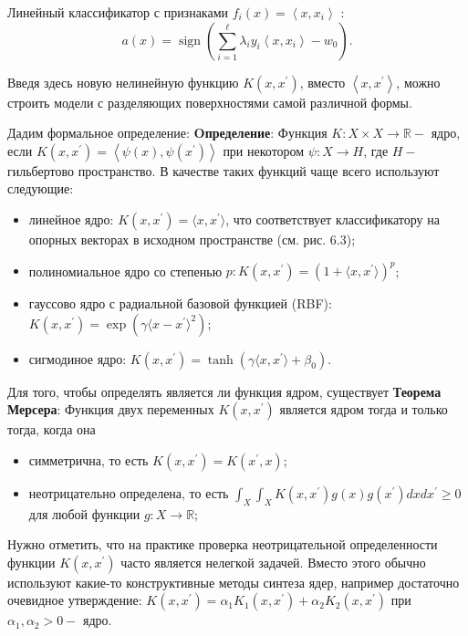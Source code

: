 Линейный классификатор с признаками $f_i(x)=\left\langle x, x_i\right\rangle$ :
$$
a(x)=\operatorname{sign}\left(\sum_{i=1}^{\ell} \lambda_i y_i\left\langle x, x_i\right\rangle-w_0\right) .
$$

Введя здесь новую нелинейную функцию $K\left(x, x^{\prime}\right)$, вместо $\left\langle x, x^{\prime}\right\rangle$,
можно строить модели с разделяющих поверхностями самой различной формы.

Дадим формальное определение:\newline
\textbf{Oпределение}:\newline
Функция $K: X \times X \rightarrow \mathbb{R}-$ ядро, если $K\left(x, x^{\prime}\right)=\left\langle\psi(x), \psi\left(x^{\prime}\right)\right\rangle$
при некотором $\psi: X \rightarrow H$, где $H-$ гильбертово пространство. \newline
В качестве таких функций чаще всего используют следующие:
\begin{itemize}
\item линейное ядро: $K(x, x^{\prime})=\langle x, x^{\prime} \rangle$, что соответствует классификатору на опорных векторах в исходном пространстве (см. рис. 6.3);
\item полиномиальное ядро со степенью $p: K(x, x^{\prime})=(1+\langle x, x^{\prime} \rangle)^p$;
\item гауссово ядро с радиальной базовой функцией (RBF): $K(x, x^{\prime})=\exp(\gamma\langle x - x^{\prime} \rangle^2)$;
\item сигмодиное ядро: $K(x, x^{\prime})=\tanh(\gamma\langle x, x^{\prime}\rangle+\beta_0)$.
\end{itemize}

Для того, чтобы определять является ли функция ядром, существует\newline
\textbf{Теорема Мерсера}:\newline
Функция двух переменных $K\left(x, x^{\prime}\right)$ является ядром тогда и только тогда, когда она
\begin{itemize}
\item симметрична, то есть $K\left(x, x^{\prime}\right)=K\left(x^{\prime}, x\right)$;
\item неотрицательно определена, то есть $\int_X \int_X K\left(x, x^{\prime}\right) g(x) g\left(x^{\prime}\right) d x d x^{\prime} \geq 0$ для любой функции $g: X \rightarrow \mathbb{R}$;
\end{itemize}

Нужно отметить, что на практике проверка неотрицательной определенности функции $K\left(x, x^{\prime}\right)$ часто является нелегкой задачей.
Вместо этого обычно используют какие-то конструктивные методы синтеза ядер, например достаточно очевидное утверждение: $K\left(x, x^{\prime}\right)=\alpha_1 K_1\left(x, x^{\prime}\right)+\alpha_2 K_2\left(x, x^{\prime}\right)$ при $\alpha_1, \alpha_2>0-$ ядро.

